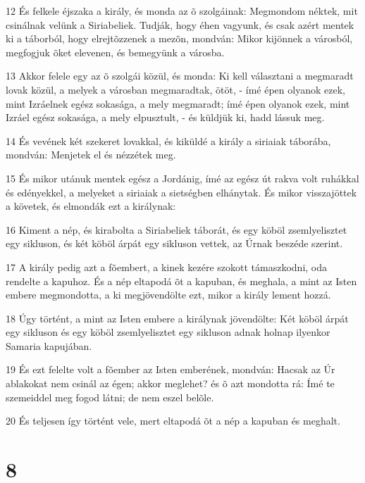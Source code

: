 \par 12 És felkele éjszaka a király, és monda az õ szolgáinak: Megmondom néktek, mit csinálnak velünk a Siriabeliek. Tudják, hogy éhen vagyunk, és csak azért mentek ki a táborból, hogy elrejtõzzenek a mezõn, mondván: Mikor kijönnek a városból, megfogjuk õket elevenen, és bemegyünk a városba.
\par 13 Akkor felele egy az õ szolgái közül, és monda: Ki kell választani a megmaradt lovak közül, a melyek a városban megmaradtak, ötöt, - ímé épen olyanok ezek, mint Izráelnek egész sokasága, a mely megmaradt; ímé épen olyanok ezek, mint Izráel egész sokasága, a mely elpusztult, - és küldjük ki, hadd lássuk meg.
\par 14 És vevének két szekeret lovakkal, és kiküldé a király a siriaiak táborába, mondván: Menjetek el és nézzétek meg.
\par 15 És mikor utánuk mentek egész a Jordánig, ímé az egész út rakva volt ruhákkal és edényekkel, a melyeket a siriaiak a sietségben elhánytak. És mikor visszajöttek a követek, és elmondák ezt a királynak:
\par 16 Kiment a nép, és kirabolta a Siriabeliek táborát, és egy köböl zsemlyelisztet egy sikluson, és két köböl árpát egy sikluson vettek, az Úrnak beszéde szerint.
\par 17 A király pedig azt a fõembert, a kinek kezére szokott támaszkodni, oda rendelte a kapuhoz. És a nép eltapodá õt a kapuban, és meghala, a mint az Isten embere megmondotta, a ki megjövendölte ezt, mikor a király lement hozzá.
\par 18 Úgy történt, a mint az Isten embere a királynak jövendölte: Két köböl árpát egy sikluson és egy köböl zsemlyelisztet egy sikluson adnak holnap ilyenkor Samaria kapujában.
\par 19 És ezt felelte volt a fõember az Isten emberének, mondván: Hacsak az Úr ablakokat nem csinál az égen; akkor meglehet? és õ azt mondotta rá: Ímé te szemeiddel meg fogod látni; de nem eszel belõle.
\par 20 És teljesen így történt vele, mert eltapodá õt a nép a kapuban és meghalt.

\chapter{8}

